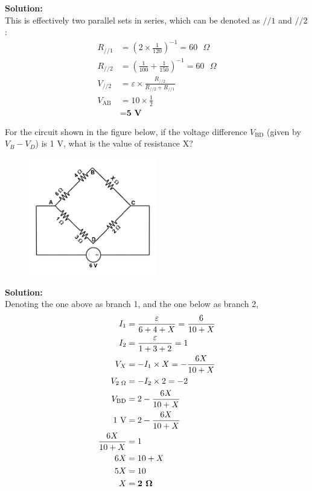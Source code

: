 \documentclass[a4paper, 12pt, addpoints]{exam}
\begin{document}
\begin{questions}
\begin{tcolorbox}
    \textbf{Solution:} \\
    This is effectively two parallel sets in series, which can be denoted as $//1$ and $//2$:
    \begin{align*}
        R_{//1} &= (2\times\frac{1}{120})^{-1} = 60\text{ }\Omega \\
        R_{//2} &= (\frac{1}{100}+\frac{1}{150})^{-1} = 60\text{ }\Omega \\
        V_{//2} &= \varepsilon \times \frac{R_{//2}}{R_{//2}+R_{//1}} \\
        V_\text{AB} &= 10 \times \frac{1}{2} \\
        &= \textbf{5 V}
    \end{align*}
\end{tcolorbox}

\question For the circuit shown in the figure below, if the voltage difference $V_\text{BD}$ (given by $V_B - V_D$) is 1 V, what is the value of resistance X?
\begin{figure}[h!]
    \centering
    \includegraphics[width=0.5\textwidth]{images/Q9.png}
\end{figure}

\begin{tcolorbox}
    \textbf{Solution:} \\
    Denoting the one above as branch 1, and the one below as branch 2,
    \begin{align*}
        I_1 &= \frac{\varepsilon}{6+4+X} = \frac{6}{10+X} \\
        I_2 &= \frac{\varepsilon}{1+3+2} = 1 \\
        V_{X} &= -I_1 \times X = -\frac{6X}{10+X} \\
        V_{2\text{ }\Omega} &= -I_2 \times 2 = -2\\
        V_\text{BD} &= 2 - \frac{6X}{10+X} \\
        \text{1 V} &= 2 - \frac{6X}{10+X} \\
        \frac{6X}{10+X} &= 1 \\
        6X &= 10 + X \\
        5X &= 10 \\
        X &= \textbf{2 }\bf{\Omega}
    \end{align*}
\end{tcolorbox}


\end{questions}
\end{document}
